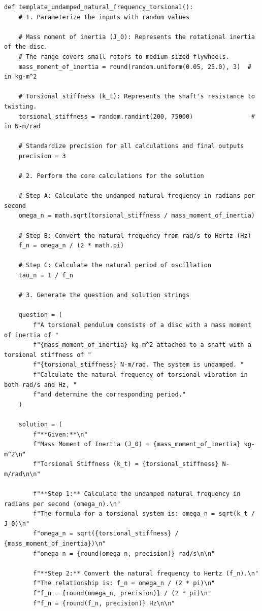 \begin{lstlisting}[style=pythonstyle]
def template_undamped_natural_frequency_torsional():
    # 1. Parameterize the inputs with random values

    # Mass moment of inertia (J_0): Represents the rotational inertia of the disc.
    # The range covers small rotors to medium-sized flywheels.
    mass_moment_of_inertia = round(random.uniform(0.05, 25.0), 3)  # in kg-m^2

    # Torsional stiffness (k_t): Represents the shaft's resistance to twisting.
    torsional_stiffness = random.randint(200, 75000)                # in N-m/rad

    # Standardize precision for all calculations and final outputs
    precision = 3

    # 2. Perform the core calculations for the solution

    # Step A: Calculate the undamped natural frequency in radians per second
    omega_n = math.sqrt(torsional_stiffness / mass_moment_of_inertia)

    # Step B: Convert the natural frequency from rad/s to Hertz (Hz)
    f_n = omega_n / (2 * math.pi)

    # Step C: Calculate the natural period of oscillation
    tau_n = 1 / f_n

    # 3. Generate the question and solution strings

    question = (
        f"A torsional pendulum consists of a disc with a mass moment of inertia of "
        f"{mass_moment_of_inertia} kg-m^2 attached to a shaft with a torsional stiffness of "
        f"{torsional_stiffness} N-m/rad. The system is undamped. "
        f"Calculate the natural frequency of torsional vibration in both rad/s and Hz, "
        f"and determine the corresponding period."
    )

    solution = (
        f"**Given:**\n"
        f"Mass Moment of Inertia (J_0) = {mass_moment_of_inertia} kg-m^2\n"
        f"Torsional Stiffness (k_t) = {torsional_stiffness} N-m/rad\n\n"

        f"**Step 1:** Calculate the undamped natural frequency in radians per second (omega_n).\n"
        f"The formula for a torsional system is: omega_n = sqrt(k_t / J_0)\n"
        f"omega_n = sqrt({torsional_stiffness} / {mass_moment_of_inertia})\n"
        f"omega_n = {round(omega_n, precision)} rad/s\n\n"

        f"**Step 2:** Convert the natural frequency to Hertz (f_n).\n"
        f"The relationship is: f_n = omega_n / (2 * pi)\n"
        f"f_n = {round(omega_n, precision)} / (2 * pi)\n"
        f"f_n = {round(f_n, precision)} Hz\n\n"


\end{lstlisting}
